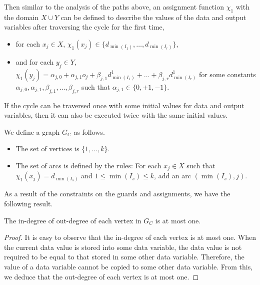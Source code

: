 \documentclass[runningheads,a4paper]{llncs}
\begin{document}
Then similar to the analysis of the paths above, an assignment function $\chi_1$ with the domain $X \cup Y$ can be defined to describe the values of the data and output variables after traversing the cycle for the first time,
\begin{itemize}
\item for each $x_j \in X$, $\chi_1(x_j) \in \{d_{\min(I_1)}, \dots, d_{\min(I_r)}\}$, 
\item and for each $y_j \in Y$, $\chi_1(y_j) = \alpha_{j,0} + \alpha_{j,1} o_j + \beta_{j,1} d^1_{\min(I_1)} + \dots + \beta_{j,r} d^1_{\min(I_r)}$ for some constants $\alpha_{j,0},\alpha_{j,1}, \beta_{j,1},\dots,\beta_{j,r}$ such that $\alpha_{j,1} \in \{0,+1,-1\}$.
\end{itemize}

\begin{lemma}
If the cycle can be traversed once with some initial values for data and output variables, then it can also be executed twice with the same initial values.
\end{lemma}

We define a graph $G_C$ as follows.
\begin{itemize}
\item The set of vertices is $\{1, \dots, k\}$.
%
\item The set of arcs is defined by the rules: 
For each $x_j \in X$ such that $\chi_1(x_j) = d_{\min(I_s)}$ and $1\le \min(I_s) \le k$, add an arc $(\min(I_s), j)$.
%
\end{itemize}

As a result of the constraints on the guards and assignments, we have the following result.

\begin{proposition}
The in-degree of out-degree of each vertex in $G_C$ is at most one.
\end{proposition}

\begin{proof}
It is easy to observe that the in-degree of each vertex is at most one. When the current data value is stored into some data variable, the data value is not required to be equal to that stored in some other data variable. Therefore, the value of a data variable cannot be copied to some other data variable. From this, we deduce that the out-degree of each vertex is at most one.
\end{proof}
\end{document}
